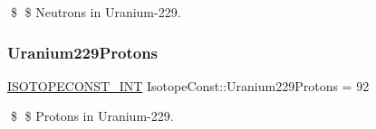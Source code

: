 \$ \$ Neutrons in Uranium-\/229. \mbox{\label{group___isotope_const-_uranium-_u229_ga756de2376ac55d23b08768d0ebcff8be}} 
\subsubsection{\texorpdfstring{Uranium229\+Protons}{Uranium229Protons}}
{\footnotesize\ttfamily \mbox{\hyperlink{group___isotope_const-_macros_ga5f18360b3e99483a35c32d789e62621c}{I\+S\+O\+T\+O\+P\+E\+C\+O\+N\+S\+T\+\_\+\+I\+NT}} Isotope\+Const\+::\+Uranium229\+Protons = 92}

\$ \$ Protons in Uranium-\/229. 